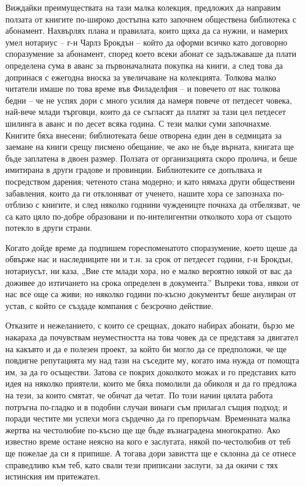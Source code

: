 \documentclass[12pt]{book}
\begin{document}
Виждайки преимуществата на тази малка колекция, предложих да направим ползата от книгите по-широко достъпна като започнем обществена библиотека с абонамент. Нахвърлях плана и правилата, които щяха да са нужни, и намерих умел нотариус – г-н Чарлз Брокдън – който да оформи всичко като договорно споразумение за абонамент, според което всеки абонат се задължаваше да плати определена сума в аванс за първоначалната покупка на книги, а след това да допринася с ежегодна вноска за увеличаване на колекцията. Толкова малко читатели имаше по това време във Филаделфия – и повечето от нас толкова бедни – че не успях дори с много усилия да намеря повече от петдесет човека, най-вече млади търговци, които да се съгласят да платят за тази цел петдесет шилинга в аванс и по десет всяка година. С тези малки суми започнахме. Книгите бяха внесени; библиотеката беше отворена един ден в седмицата за заемане на книги срещу писмено обещание, че ако не бъде върната, книгата ще бъде заплатена в двоен размер. Ползата от организацията скоро пролича, и беше имитирана в други градове и провинции. Библиотеките се допълваха и посредством дарения; четеното стана модерно; и като нямаха други обществени забавления, които да ги отклоняват от ученето, нашите хора се запознаха по-отблизо с книгите, и след няколко годнини чужденицте почнаха да отбелязват, че са като цяло по-добре образовани и по-интелигентни отколкото хора от същото потекло в други страни.

Когато дойде време да подпишем гореспоменатото споразумение, което щеше да обвърже нас и наследниците ни и т.н. за срок от петдесет години, г-н Брокдън, нотариусът, ни каза, „Вие сте млади хора, но е малко вероятно някой от вас да доживее до изтичането на срока определен в документа.” Въпреки това, някои от нас все още са живи; но няколко години по-късно документът беше анулиран от устав, с който се създаде компания с безсрочно действие.

Отказите и нежеланието, с които се срещнах, докато набирах абонати, бързо ме накараха да почувствам неуместността на това човек да се представя за двигател на какъвто и да е полезен проект, за който би могло да се предположи, че ще повдигне репутацията му над тази на съседите му, когато има нужда от помощта им, за да го осъществи. Затова се покрих доколкото можах и го представих като идея на няколко приятели, които ме бяха помолили да обиколя и да го предложа на тези, за които смятат, че обичат да четат. По този начин цялата работа потръгна по-гладко и в подобни случаи винаги съм прилагал същия подход; и поради честите ми успехи мога сърдечно да го препоръчам. Временната малка жертва на честолюбие по-късно ще ще бъде възнаградена многократно. Ако известно време остане неясно на кого е заслугата, някой по-честолюбив от теб ще пожелае да си я припише. А тогава дори завистта ще е склонна да се отнесе справедливо към теб, като свали тези приписани заслуги, за да окичи с тях истинския им притежател.
\end{document}
